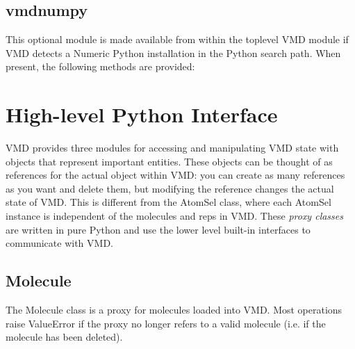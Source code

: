 \subsection{vmdnumpy}
This optional module is made available from within the toplevel VMD module
if VMD detects a Numeric Python installation in the Python search path.
When present, the following methods are provided:

\begin{itemize}
\end{itemize}

\section{High-level Python Interface}
VMD provides three modules for accessing and manipulating VMD state
with objects that represent important entities.  These objects can
be thought of as references for the actual object within VMD: you
can create as many references as you want and delete them, but modifying
the reference changes the actual state of VMD.  This is different from
the AtomSel class, where each AtomSel instance is independent of 
the molecules and reps in VMD.  These {\it proxy classes} are written
in pure Python and use the lower level built-in interfaces to communicate
with VMD.

\subsection{Molecule}
The Molecule class is a proxy for molecules loaded into VMD.  Most 
operations raise ValueError if the proxy no longer refers to a valid
molecule (i.e. if the molecule has been deleted).  

